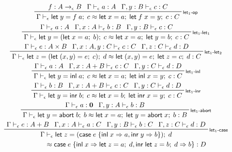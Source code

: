 \documentclass[acmsmall,screen,review]{acmart}
\newcommand{\mb}[1]{\ensuremath{\mathbf{#1}}}
\newcommand{\ms}[1]{\ensuremath{\mathsf{#1}}}
\newcommand{\lto}{\Rightarrow}
\newcommand{\linl}[1]{\ms{inl}\;{#1}}
\newcommand{\linr}[1]{\ms{inr}\;{#1}}
\newcommand{\labort}[1]{\ms{abort}\;{#1}}
\newcommand{\letexpr}[3]{\ensuremath{\ms{let}\;#1 = #2;\;#3}}
\newcommand{\caseexpr}[5]{\ms{case}\;#1\;\{\linl{#2} \lto #3, \linr{#4} \lto #5\}}
\newcommand{\bhyp}[2]{#1 : #2}
\newcommand{\rle}[1]{{\scriptsize\textsf{#1}}}
\newcommand{\hasty}[4]{#1 \vdash_{#2} #3: {#4}}
\newcommand{\isop}[4]{#1: #2 \to_{#4} #3}
\newcommand{\teqv}{\approx}
\newcommand{\tmeq}[5]{#1 \vdash_{#2} #3 \teqv #4 : {#5}}
\begin{document}
\begin{gather*}
  \prftree[r]{\rle{let$_1$-op}}
    {\isop{f}{A}{B}{\epsilon}}
    {\hasty{\Gamma}{\epsilon}{a}{A}}
    {\hasty{\Gamma, \bhyp{y}{B}}{\epsilon}{c}{C}}
    {\tmeq{\Gamma}{\epsilon}{\letexpr{y}{f\;a}{c}}{\letexpr{x}{a}{\letexpr{f\;x}{y}{c}}}{C}}
  \\
  \prftree[r]{\rle{let$_1$-let$_1$}}
    {\hasty{\Gamma}{\epsilon}{a}{A}}
    {\hasty{\Gamma, \bhyp{x}{A}}{\epsilon}{b}{B}}
    {\hasty{\Gamma, \bhyp{y}{B}}{\epsilon}{c}{C}}
    {\tmeq{\Gamma}{\epsilon}
      {\letexpr{y}{(\letexpr{x}{a}{b})}{c}}
      {\letexpr{x}{a}{\letexpr{y}{b}{c}}}{C}}
  \\
  \prftree[r]{\rle{let$_1$-let$_2$}}
    {\hasty{\Gamma}{\epsilon}{e}{A \times B}}
    {\hasty{\Gamma, \bhyp{x}{A}, \bhyp{y}{C}}{\epsilon}{c}{C}}
    {\hasty{\Gamma, \bhyp{z}{C}}{\epsilon}{d}{D}}
    {\tmeq{\Gamma}{\epsilon}
      {\letexpr{z}{(\letexpr{(x, y)}{e}{c})}{d}}
      {\letexpr{(x, y)}{e}{\letexpr{z}{c}{d}}}{C}}
  \\
  \prftree[r]{\rle{let$_1$-inl}}
    {\hasty{\Gamma}{\epsilon}{a}{A}}
    {\hasty{\Gamma, \bhyp{x}{A + B}}{\epsilon}{c}{C}}
    {\hasty{\Gamma, \bhyp{y}{C}}{\epsilon}{d}{D}}
    {\tmeq{\Gamma}{\epsilon}{\letexpr{y}{\linl{a}}{c}}{\letexpr{x}{a}{\letexpr{\linl{x}}{y}{c}}}{C}}
  \\
  \prftree[r]{\rle{let$_1$-inr}}
    {\hasty{\Gamma}{\epsilon}{b}{B}}
    {\hasty{\Gamma, \bhyp{x}{A + B}}{\epsilon}{c}{C}}
    {\hasty{\Gamma, \bhyp{y}{C}}{\epsilon}{d}{D}}
    {\tmeq{\Gamma}{\epsilon}{\letexpr{y}{\linr{b}}{c}}{\letexpr{x}{b}{\letexpr{\linr{x}}{y}{c}}}{C}}
  \\
  \prftree[r]{\rle{let$_1$-abort}}
    {\hasty{\Gamma}{\epsilon}{a}{\mb{0}}}
    {\hasty{\Gamma, \bhyp{y}{A}}{\epsilon}{b}{B}}
    {\tmeq{\Gamma}{\epsilon}
      {\letexpr{y}{\labort{b}}{b}}
      {\letexpr{x}{a}{\letexpr{y}{\labort{x}}{b}}}{B}}
  \\
  \prftree[r]{\rle{let$_1$-case}}
    {\hasty{\Gamma}{\epsilon}{e}{A + B}}
    {\hasty{\Gamma, \bhyp{x}{A}}{\epsilon}{a}{C}}
    {\hasty{\Gamma, \bhyp{y}{B}}{\epsilon}{b}{C}}
    {\hasty{\Gamma, \bhyp{z}{C}}{\epsilon}{d}{D}}
    { 
      \prfStackPremises
      {\Gamma \vdash_\epsilon \letexpr{z}{(\caseexpr{e}{x}{a}{y}{b})}{d}}
      {\hspace{6em} \teqv \caseexpr{e}{x}{\letexpr{z}{a}{d}}{\letexpr{z}{b}{d}}{b} : D}
    }
\end{gather*}
\end{document}
